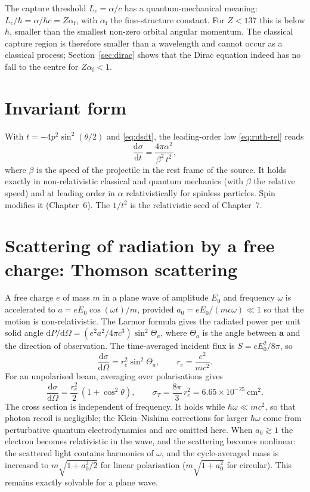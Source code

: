 \documentclass[11pt,a4paper]{book}
\numberwithin{equation}{chapter}
\newcommand{\dd}{\mathrm{d}}
\newcommand{\dsdO}{\frac{\dd\sigma}{\dd\Omega}}
\newcommand{\afs}{\alpha_{\mathrm{f}}}
\begin{document}
The capture threshold $L_c=\alpha/c$ has a quantum-mechanical meaning:
$L_c/\hbar=\alpha/\hbar c=Z\afs$, with $\afs$ the fine-structure constant. For
$Z<137$ this is below $\hbar$, smaller than the smallest non-zero orbital
angular momentum. The classical capture region is therefore smaller than a
wavelength and cannot occur as a classical process; Section~\ref{sec:dirac}
shows that the Dirac equation indeed has no fall to the centre for $Z\afs<1$.

\section{Invariant form}

With $t=-4p^2\sin^2(\theta/2)$ and \eqref{eq:dsdt}, the leading-order law
\eqref{eq:ruth-rel} reads
\begin{equation}\label{eq:dsdt-rel}
  \frac{\dd\sigma}{\dd t}=\frac{4\pi\alpha^2}{\beta^2\,t^2},
\end{equation}
where $\beta$ is the speed of the projectile in the rest frame of the source. It
holds exactly in non-relativistic classical and quantum mechanics (with $\beta$
the relative speed) and at leading order in $\alpha$ relativistically for
spinless particles. Spin modifies it (Chapter~6). The $1/t^2$ is the
relativistic seed of Chapter~7.

\section{Scattering of radiation by a free charge: Thomson scattering}

A free charge $e$ of mass $m$ in a plane wave of amplitude $E_0$ and frequency
$\omega$ is accelerated to $a=eE_0\cos(\omega t)/m$, provided
$a_0=eE_0/(mc\omega)\ll1$ so that the motion is non-relativistic. The Larmor
formula gives the radiated power per unit solid angle
$\dd P/\dd\Omega=(e^2a^2/4\pi c^3)\sin^2\Theta_a$, where $\Theta_a$ is the angle
between $\bm a$ and the direction of observation. The time-averaged incident
flux is $S=cE_0^2/8\pi$, so
\begin{equation}\label{eq:thomson-b}
  \dsdO=r_e^2\sin^2\Theta_a,\qquad r_e=\frac{e^2}{mc^2}.
\end{equation}
For an unpolarised beam, averaging over polarisations gives
\begin{equation}\label{eq:thomson-u}
  \dsdO=\frac{r_e^2}{2}\,(1+\cos^2\theta),\qquad
  \sigma_T=\frac{8\pi}{3}\,r_e^2=6.65\times10^{-25}\ \mathrm{cm}^2 .
\end{equation}
The cross section is independent of frequency. It holds while
$\hbar\omega\ll mc^2$, so that photon recoil is negligible; the Klein--Nishina
corrections for larger $\hbar\omega$ come from perturbative quantum
electrodynamics and are omitted here. When $a_0\gtrsim1$ the electron becomes
relativistic in the wave, and the scattering becomes nonlinear: the scattered
light contains harmonics of $\omega$, and the cycle-averaged mass is increased to
$m\sqrt{1+a_0^2/2}$ for linear polarisation ($m\sqrt{1+a_0^2}$ for circular).
This remains exactly solvable for a plane wave.
\end{document}
